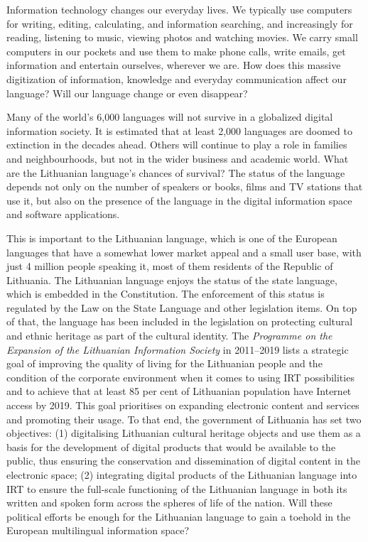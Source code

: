 \begin{multicols}{2}
Information technology changes our everyday lives. We typically use computers for writing, editing, calculating, and information searching, and increasingly for reading, listening to music, viewing photos and watching movies. We carry small computers in our pockets and use them to make phone calls, write emails, get information and entertain ourselves, wherever we are. How does this massive digitization of information, knowledge and everyday communication affect our language? Will our language change or even disappear?

Many of the world’s 6,000 languages will not survive in a globalized digital information society. It is estimated that at least 2,000 languages are doomed to extinction in the decades ahead. Others will continue to play a role in families and neighbourhoods, but not in the wider business and academic world. What are the Lithuanian language’s chances of survival? The status of the language depends not only on the number of speakers or books, films and TV stations that use it, but also on the presence of the language in the digital information space and software applications.

This is important to the Lithuanian language, which is one of the European languages that have a somewhat lower market appeal and a small user base, with just 4 million people speaking it, most of them residents of the Republic of Lithuania. The Lithuanian language enjoys the status of the state language, which is embedded in the Constitution. The enforcement of this status is regulated by the Law on the State Language and other legislation items. On top of that, the language has been included in the legislation on protecting cultural and ethnic heritage as part of the cultural identity. The \textit{Programme on the Expansion of the Lithuanian Information Society} in 2011–2019 lists a strategic goal of improving the quality of living for the Lithuanian people and the condition of the corporate environment when it comes to using IRT possibilities and to achieve that at least 85 per cent of Lithuanian population have Internet access by 2019. This goal prioritises on expanding electronic content and services and promoting their usage. To that end, the government of Lithuania has set two objectives: (1) digitalising Lithuanian cultural heritage objects and use them as a basis for the development of digital products that would be available to the public, thus ensuring the conservation and dissemination of digital content in the electronic space; (2) integrating digital products of the Lithuanian language into IRT to ensure the full-scale functioning of the Lithuanian language in both its written and spoken form across the spheres of life of the nation. Will these political efforts be enough for the Lithuanian language to gain a toehold in the European multilingual information space?


\end{multicols}
